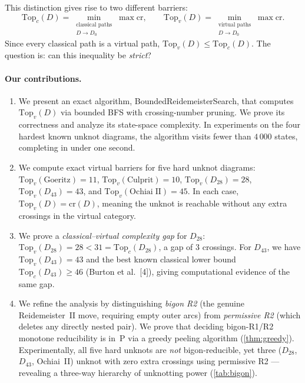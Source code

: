 \documentclass[a4paper,UKenglish,cleveref,autoref]{lipics-v2021}
\newcommand{\BRS}{\textsf{Bounded\-Reide\-meister\-Search}\xspace}
\begin{document}
This distinction gives rise to two different barriers:
\[
\mathrm{Top}_c(D) = \min_{\substack{\text{classical paths} \\ D \to D_0}} \max \mathrm{cr},
\qquad
\mathrm{Top}_v(D) = \min_{\substack{\text{virtual paths} \\ D \to D_0}} \max \mathrm{cr}.
\]
Since every classical path is a virtual path, $\mathrm{Top}_v(D) \leq \mathrm{Top}_c(D)$.
The question is: can this inequality be \emph{strict}?

\paragraph*{Our contributions.}
\begin{enumerate}
\item We present an exact algorithm, \BRS, that computes $\mathrm{Top}_v(D)$ via bounded BFS with crossing-number pruning.
We prove its correctness and analyze its state-space complexity.
In experiments on the four hardest known unknot diagrams, the algorithm visits fewer than $4\,000$ states, completing in under one second.

\item We compute exact virtual barriers for five hard unknot diagrams:
$\mathrm{Top}_v(\mathrm{Goeritz}) = 11$,
$\mathrm{Top}_v(\mathrm{Culprit}) = 10$,
$\mathrm{Top}_v(D_{28}) = 28$,
$\mathrm{Top}_v(D_{43}) = 43$, and
$\mathrm{Top}_v(\mathrm{Ochiai\;II}) = 45$.
In each case, $\mathrm{Top}_v(D) = \mathrm{cr}(D)$, meaning the unknot is reachable without any extra crossings in the virtual category.

\item We prove a \emph{classical--virtual complexity gap} for $D_{28}$: $\mathrm{Top}_v(D_{28}) = 28 < 31 = \mathrm{Top}_c(D_{28})$, a gap of $3$ crossings.
For $D_{43}$, we have $\mathrm{Top}_v(D_{43}) = 43$ and the best known classical lower bound $\mathrm{Top}_c(D_{43}) \geq 46$ (Burton et al.\ [4]), giving computational evidence of the same gap.

\item We refine the analysis by distinguishing \emph{bigon R2} (the genuine Reidemeister~II move, requiring empty outer arcs) from \emph{permissive R2} (which deletes any directly nested pair). We prove that deciding bigon-R1/R2 monotone reducibility is in~P via a greedy peeling algorithm (\cref{thm:greedy}).
Experimentally, all five hard unknots are \emph{not} bigon-reducible, yet three ($D_{28}$, $D_{43}$, Ochiai~II) unknot with zero extra crossings using permissive R2 --- revealing a three-way hierarchy of unknotting power (\cref{tab:bigon}).
\end{enumerate}
\end{document}

